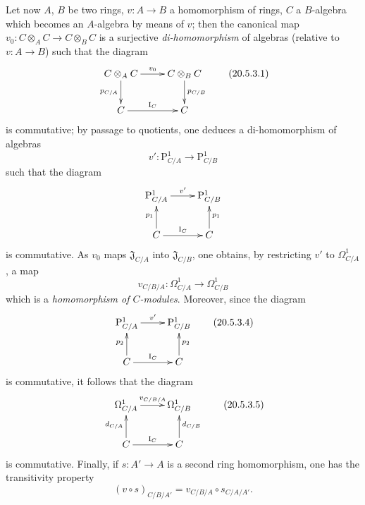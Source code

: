 \begin{env}[20.5.3]
\label{0.20.5.3}
Let now $A$, $B$ be two rings, $v:A\to B$ a homomorphism of rings, $C$ a $B$-algebra which becomes an $A$-algebra by means of $v$; then the canonical map $v_0:C\otimes_A C\to C\otimes_B C$ is a surjective \emph{di-homomorphism} of algebras (relative to $v:A\to B$) such that the diagram
\[
\xymatrix{
  C\otimes_A C \ar[r]^{v_0} \ar[d]_{p_{C/A}} & C\otimes_B C \ar[d]^{p_{C/B}} \\
  C \ar[r]^{\mathrm{I}_C} & C
}
\tag{20.5.3.1}
  \label{0.20.5.3.1}
\]
is commutative; by passage to quotients, one deduces a di-homomorphism of algebras
\begin{equation}
\tag{20.5.3.2}
  \label{0.20.5.3.2}
  v':\mathrm{P}^1_{C/A}\to\mathrm{P}^1_{C/B}
\end{equation}
such that the diagram
\[
\xymatrix{
  \mathrm{P}^1_{C/A} \ar[r]^{v'} & \mathrm{P}^1_{C/B} \\
  C \ar[u]^{p_1} \ar[r]^{\mathrm{I}_C} & C \ar[u]_{p_1}
}
\]
is commutative.
As $v_0$ maps $\mathfrak{J}_{C/A}$ into $\mathfrak{J}_{C/B}$, one obtains, by restricting $v'$ to $\Omega^1_{C/A}$, a map
\begin{equation}
\tag{20.5.3.3}
  \label{0.20.5.3.3}
  v_{C/B/A}:\Omega^1_{C/A}\to\Omega^1_{C/B}
\end{equation}
which is a \emph{homomorphism of $C$-modules}.
Moreover, since the diagram
\begin{equation}
\label{0.20.5.3.4}
\xymatrix{
  \mathrm{P}^1_{C/A} \ar[r]^{v'} & \mathrm{P}^1_{C/B} \\
  C \ar[u]^{p_2} \ar[r]^{\mathrm{I}_C} & C \ar[u]_{p_2}
}
\tag{20.5.3.4}
\end{equation}
is commutative, it follows that the diagram
\[
\xymatrix{
  \Omega^1_{C/A} \ar[r]^{v_{C/B/A}} & \Omega^1_{C/B} \\
  C \ar[u]^{d_{C/A}} \ar[r]^{\mathrm{I}_C} & C \ar[u]_{d_{C/B}}
}
\tag{20.5.3.5}
  \label{0.20.5.3.5}
\]
is commutative.
Finally, if $s:A'\to A$ is a second ring homomorphism, one has the transitivity property
\begin{equation}
\tag{20.5.3.6}
  \label{0.20.5.3.6}
  (v\circ s)_{C/B/A'} = v_{C/B/A}\circ s_{C/A/A'}.
\end{equation}
\end{env}

